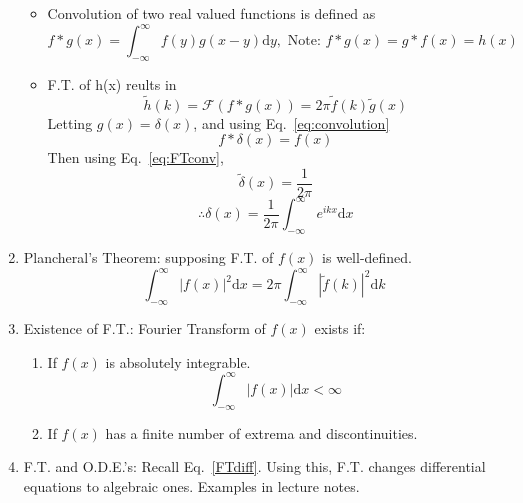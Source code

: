 \documentclass{article}
\begin{document}
\begin{enumerate}
\begin{itemize}
\item Convolution of two real valued functions is defined as
\begin{equation}
f*g(x) = \int_{-\infty}^{\infty}f(y)g(x-y)\mathrm{d}y, \text{ Note: }f*g(x)=g*f(x)=h(x)
\label{eq:convolution}
\end{equation}
\item F.T. of h(x) reults in
\begin{equation}
\tilde{h}(k)=\mathcal{F}(f*g(x))=2\pi \tilde{f}(k)\tilde{g}(x)
\label{eq:FTconv}
\end{equation}
Letting $g(x) = \delta(x)$, and using Eq.~\ref{eq:convolution}
\begin{equation}
f*\delta(x)=f(x)
\end{equation}
Then using Eq.~\ref{eq:FTconv},
\begin{equation}
\tilde{\delta}(x)=\frac{1}{2\pi}
\end{equation}
\begin{equation}
\therefore \delta(x) = \frac{1}{2\pi}\int_{-\infty}^{\infty}e^{ikx}\mathrm{d}x
\end{equation}
\end{itemize}
\item Plancheral's Theorem: supposing F.T. of $f(x)$ is well-defined.
\begin{equation}
\int_{-\infty}^{\infty}|f(x)|^2\mathrm{d}x = 2\pi\int_{-\infty}^{\infty}|\tilde{f}(k)|^2\mathrm{d}k
\end{equation}
\item Existence of F.T.: Fourier Transform of $f(x)$ exists if:
\begin{enumerate}
\item If $f(x)$ is absolutely integrable.
\begin{equation}
\int_{-\infty}^{\infty}|f(x)|\mathrm{d}x < \infty
\end{equation}
\item If $f(x)$ has a finite number of extrema and discontinuities.
\end{enumerate}
\item F.T. and O.D.E.'s: Recall Eq.~\ref{FTdiff}. Using this, F.T. changes differential equations to algebraic ones. Examples in lecture notes.
\end{enumerate}
\end{document}
